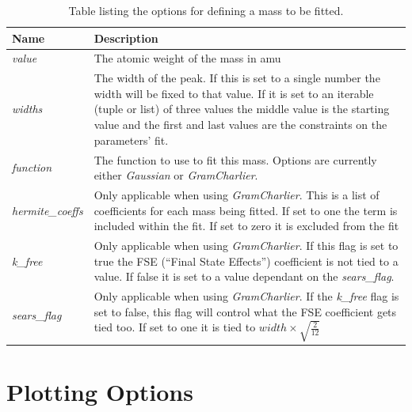 \documentclass[paper=a4, fontsize=11pt]{scrartcl}	%
\numberwithin{equation}{section}															%
\numberwithin{figure}{section}																%
\numberwithin{table}{section}
\begin{document}
\begin{appendices}
\begin{table}[H]
\centering
\begin{tabular}{ l p{12cm}}
Name & Description \\ \hline
\textit{value} & The atomic weight of the mass in amu \\ \hline
\textit{widths} & The width of the peak. If this is set to a single number the width will be fixed to that value. If it is set to an iterable (tuple or list) of three values the middle value is the starting value and the first and last values are the constraints on the parameters' fit. \\ \hline
\textit{function} & The function to use to fit this mass. Options are currently either \textit{Gaussian} or \textit{GramCharlier}. \\ \hline
\textit{hermite\_coeffs} & Only applicable when using \textit{GramCharlier}. This is a list of coefficients for each mass being fitted. If set to one the term is included within the fit. If set to zero it is excluded from the fit\\ \hline
\textit{k\_free} & Only applicable when using \textit{GramCharlier}. If this flag is set to true the FSE (``Final State Effects'') coefficient is not tied to a value. If false it is set to a value dependant on the \textit{sears\_flag}.\\ \hline
\textit{sears\_flag} & Only applicable when using \textit{GramCharlier}. If the \textit{k\_free} flag is set to false, this flag will control what the FSE coefficient gets tied too. If set to one it is tied to $width\times\sqrt{\frac{2}{12}}$\\ \hline
\end{tabular}
\caption{Table listing the options for defining a mass to be fitted.}
\label{table:mass-parameters}
\end{table}

\section{Plotting Options}
\label{sec:plotting-options}


\end{appendices}
\end{document}
